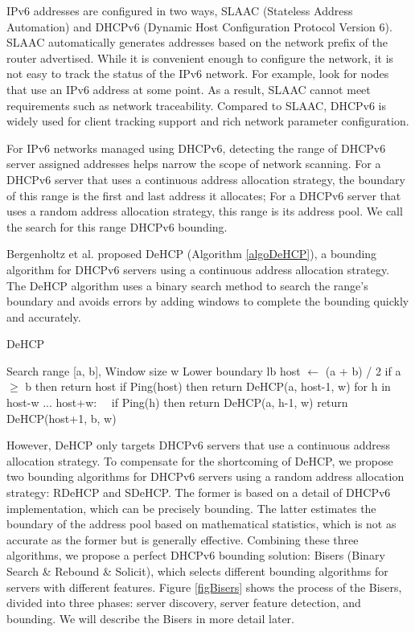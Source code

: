 \documentclass[conference]{IEEEtran}
\begin{document}
IPv6 addresses are configured in two ways, SLAAC (Stateless Address
Automation) and DHCPv6 (Dynamic Host Configuration Protocol Version
6). SLAAC automatically generates addresses based on the network
prefix of the router advertised. While it is convenient enough to
configure the network, it is not easy to track the status of the IPv6
network. For example, look for nodes that use an IPv6 address at some
point. As a result, SLAAC cannot meet requirements such as network
traceability. Compared to SLAAC, DHCPv6 is widely used for client
tracking support and rich network parameter configuration.

For IPv6 networks managed using DHCPv6, detecting the range of DHCPv6
server assigned addresses helps narrow the scope of network
scanning. For a DHCPv6 server that uses a continuous address
allocation strategy, the boundary of this range is the first and last
address it allocates; For a DHCPv6 server that uses a random address
allocation strategy, this range is its address pool. We call the
search for this range DHCPv6 bounding.

Bergenholtz et al. \cite{bergenholtz_finding_2019} proposed DeHCP
(Algorithm \ref{algoDeHCP}), a bounding algorithm for DHCPv6 servers
using a continuous address allocation strategy. The DeHCP algorithm
uses a binary search method to search the range's boundary and avoids
errors by adding windows to complete the bounding quickly and
accurately.

\begin{algorithm}[H]
  \caption{DeHCP}
  \label{algoDeHCP}
  \renewcommand{\algorithmicrequire}{\textbf{Input:}}
  \renewcommand{\algorithmicensure}{\textbf{Output:}}
  \begin{algorithmic}[1]
    \REQUIRE Search range [a, b], Window size w
    \ENSURE Lower boundary lb
    \STATE host $\gets$ (a + b) / 2
    \STATE if a $\ge$ b then return host
    \STATE if Ping(host) then return DeHCP(a, host-1, w)
    \STATE for h in host-w ... host+w:
    \STATE \ \ if Ping(h) then return DeHCP(a, h-1, w)
    \STATE return DeHCP(host+1, b, w)
  \end{algorithmic}
\end{algorithm}

However, DeHCP only targets DHCPv6 servers that use a continuous
address allocation strategy. To compensate for the shortcoming of
DeHCP, we propose two bounding algorithms for DHCPv6 servers using a
random address allocation strategy: RDeHCP and SDeHCP. The former is
based on a detail of DHCPv6 implementation, which can be precisely
bounding. The latter estimates the boundary of the address pool based
on mathematical statistics, which is not as accurate as the former but
is generally effective. Combining these three algorithms, we propose a
perfect DHCPv6 bounding solution: Bisers (Binary Search \& Rebound \&
Solicit), which selects different bounding algorithms for servers with
different features. Figure \ref{figBisers} shows the process of the
Bisers, divided into three phases: server discovery, server feature
detection, and bounding. We will describe the Bisers in more detail
later.
\end{document}
